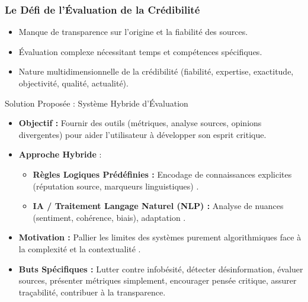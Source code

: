 \documentclass[9pt]{beamer}
\begin{document}
\begin{frame}
  \frametitle{Le Défi de l'Évaluation de la Crédibilité}
  \begin{itemize}
    \item Manque de transparence sur l'origine et la fiabilité des sources. \citet{Metzger2010, W3CCredibility2018, Pescuma2025, Rieh2014Credibility}
    \item Évaluation complexe nécessitant temps et compétences spécifiques.
    \item Nature multidimensionnelle de la crédibilité (fiabilité, expertise, exactitude, objectivité, qualité, actualité). \citet{Pescuma2025, Metzger2010}
  \end{itemize}
\end{frame}


\begin{frame}{Solution Proposée : Système Hybride d'Évaluation}
  \begin{itemize}
    \item \textbf{Objectif :} Fournir des outils (métriques, analyse sources, opinions divergentes) pour aider l'utilisateur à développer son esprit critique.
    \item \textbf{Approche Hybride} \citet{Ahmed2025Aidriven} :
      \begin{itemize}
        \item \textbf{Règles Logiques Prédéfinies :} Encodage de connaissances explicites (réputation source, marqueurs linguistiques) \citet{Kedzie2018, W3CCredibility2018}. %
        \item \textbf{IA / Traitement Langage Naturel (NLP) :} Analyse de nuances (sentiment, cohérence, biais), adaptation \citet{Ahmed2025Aidriven, Loth2024, Chen2024Combating}. %
      \end{itemize}
    \item \textbf{Motivation :} Pallier les limites des systèmes purement algorithmiques face à la complexité et la contextualité \citet{Nabozny2021}. %
    \item \textbf{Buts Spécifiques :} Lutter contre infobésité, détecter désinformation, évaluer sources, présenter métriques simplement, encourager pensée critique, assurer traçabilité, contribuer à la transparence.
  \end{itemize}
\end{frame}
\end{document}
